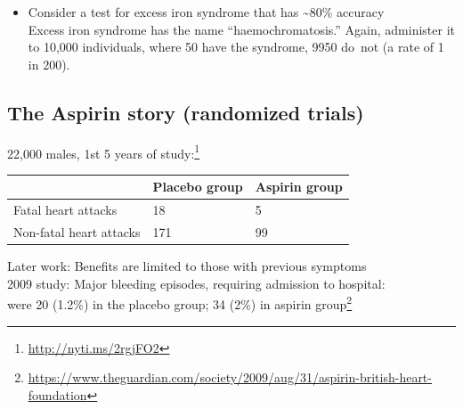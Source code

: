 \documentclass[
  10pt,
  b5paper]{book}
\providecommand{\tightlist}{%
  \setlength{\itemsep}{0pt}\setlength{\parskip}{0pt}}
\begin{document}

\begin{itemize}
\tightlist
\item
  Consider a test for excess iron syndrome that has \textasciitilde80\% accuracy\\
  Excess iron syndrome has the name ``haemochromatosis.'' Again,
  administer it to 10,000 individuals, where 50 have the syndrome,
  9950 do~not (a rate of 1 in 200).
\end{itemize}


\hypertarget{the-aspirin-story-randomized-trials}{%
\subsection*{The Aspirin story (randomized trials)}\label{the-aspirin-story-randomized-trials}}

22,000 males, 1st 5 years of study:\footnote{\url{http://nyti.ms/2rgjFO2}}

\begin{longtable}[]{@{}lll@{}}
\toprule
& Placebo group & Aspirin group \\
\midrule
\endhead
Fatal heart attacks & 18 & 5 \\
Non-fatal heart attacks & 171 & 99 \\
\bottomrule
\end{longtable}

Later work: Benefits are limited to those with previous symptoms\\
2009 study: Major bleeding episodes, requiring admission to hospital:\\
were 20 (1.2\%) in the placebo group; 34 (2\%) in aspirin group\footnote{\url{https://www.theguardian.com/society/2009/aug/31/aspirin-british-heart-foundation}}
\end{document}
